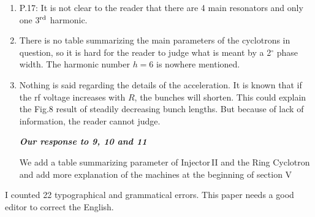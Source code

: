 \documentclass[10pt]{report}
\begin{document}
\begin{enumerate}
 \item P.17: It is not clear to the reader that there are 4 main resonators and
 only one 3$^{\rm rd}$ harmonic.
 
 \item There is no table summarizing the main parameters of the cyclotrons in
 question, so it is hard for the reader to judge what is meant by a 2$^\circ$
 phase width. The harmonic number $h=6$ is nowhere mentioned.

 \item Nothing is said regarding the details of the acceleration. It is known
 that if the rf voltage increases with $R$, the bunches will shorten. This could
 explain the Fig.8 result of steadily decreasing bunch lengths. But because of
 lack of information, the reader cannot judge.


 \vspace{+2mm}
 {\it {\bf Our response to 9, 10 and 11}  

We add a table summarizing parameter of Injector\,II and the Ring Cyclotron and
add more explanation of the machines at the beginning of section V 

 }
 \vspace{+2mm}
 
 \end{enumerate}
 
 I counted 22 typographical and grammatical errors. This paper needs a good
 editor to correct the English.
 
\end{document}
